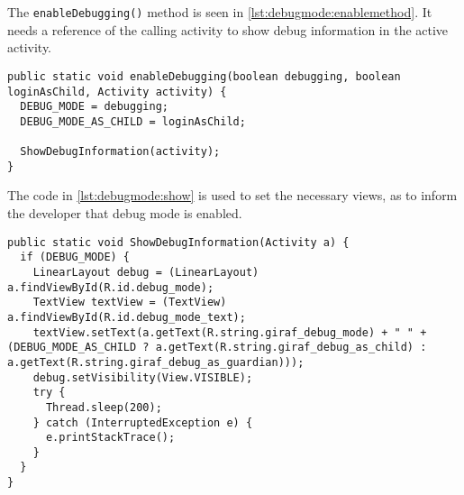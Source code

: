The \lstinline|enableDebugging()| method is seen in \cref{lst:debugmode:enablemethod}.
It needs a reference of the calling activity to show debug information in the active activity.

\begin{lstlisting}[caption={Enable debug mode by calling \lstinline|enableDebugging()|.},label={lst:debugmode:enablemethod}]  
public static void enableDebugging(boolean debugging, boolean loginAsChild, Activity activity) {
  DEBUG_MODE = debugging;
  DEBUG_MODE_AS_CHILD = loginAsChild;

  ShowDebugInformation(activity);
}
\end{lstlisting}

The code in \cref{lst:debugmode:show} is used to set the necessary views, as to inform the developer that debug mode is enabled.

\begin{lstlisting}[caption={Show a debug information on activity if debug is enabled.},label={lst:debugmode:show}]  
public static void ShowDebugInformation(Activity a) {
  if (DEBUG_MODE) {
    LinearLayout debug = (LinearLayout) a.findViewById(R.id.debug_mode);
    TextView textView = (TextView) a.findViewById(R.id.debug_mode_text);
    textView.setText(a.getText(R.string.giraf_debug_mode) + " " + (DEBUG_MODE_AS_CHILD ? a.getText(R.string.giraf_debug_as_child) : a.getText(R.string.giraf_debug_as_guardian)));
    debug.setVisibility(View.VISIBLE);
    try {
      Thread.sleep(200);
    } catch (InterruptedException e) {
      e.printStackTrace();
    }
  }
}
\end{lstlisting}